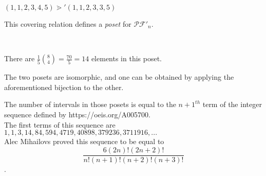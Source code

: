 \begin{example}[$n = 6$]
    $(1, 1, 2, 3, 4, 5) \gtrdot' (1, 1, 2, 3, 3, 5)$    
\end{example}

\begin{prop}
    This covering relation defines a \emph{poset}
    for $\mathcal{PF'}_n$.
\end{prop}

\begin{example}
    ~\\
    \begin{center}
        
        There are $\frac {1}{5} \binom{8}{4} = \frac{70}{5} = 14$
        elements in this poset.
    \end{center}
\end{example}

\begin{rem}
    The two posets are isomorphic, and one can be obtained by
    applying the aforementioned bijection to the other.
\end{rem}

\begin{theorem}
    The number of intervals in those posets is equal to
    the $n+1^{th}$ term of the integer sequence defined by
    https://oeis.org/A005700.\\
    The first terms of this sequence are $1, 1, 3, 14, 84,
    594, 4719, 40898, 379236, 3711916, ...$\\
    Alec Mihailovs proved this sequence to be equal to
    $$\frac {6 (2n)! (2n+2)!}{n!(n+1)!(n+2)!(n+3)!}$$.
\end{theorem}


